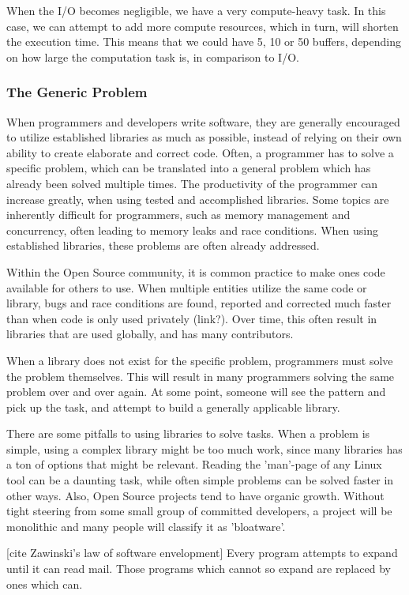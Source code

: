 \documentclass[a4paper]{article}
\begin{document}
When the I/O becomes negligible, we have a very compute-heavy task. In this case, we can attempt to add more compute resources, which in turn, will shorten the execution time. This means that we could have 5, 10 or 50 buffers, depending on how large the computation task is, in comparison to I/O.


\subsubsection{The Generic Problem}
When programmers and developers write software, they are generally encouraged to utilize established libraries as much as possible, instead of relying on their own ability to create elaborate and correct code. Often, a programmer has to solve a specific problem, which can be translated into a general problem which has already been solved multiple times. The productivity of the programmer can increase greatly, when using tested and accomplished libraries. Some topics are inherently difficult for programmers, such as memory management and concurrency, often leading to memory leaks and race conditions. When using established libraries, these problems are often already addressed.

Within the Open Source community, it is common practice to make ones code available for others to use. When multiple entities utilize the same code or library, bugs and race conditions are found, reported and corrected much faster than when code is only used privately (link?). Over time, this often result in libraries that are used globally, and has many contributors.

When a library does not exist for the specific problem, programmers must solve the problem themselves. This will result in many programmers solving the same problem over and over again. At some point, someone will see the pattern and pick up the task, and attempt to build a generally applicable library.

There are some pitfalls to using libraries to solve tasks. When a problem is simple, using a complex library might be too much work, since many libraries has a ton of options that might be relevant. Reading the 'man'-page of any Linux tool can be a daunting task, while often simple problems can be solved faster in other ways. Also, Open Source projects tend to have organic growth. Without tight steering from some small group of committed developers, a project will be monolithic and many people will classify it as 'bloatware'.

[cite Zawinski's law of software envelopment]
    Every program attempts to expand until it can read mail. Those programs which cannot so expand are replaced by ones which can.
\end{document}
